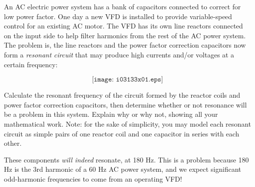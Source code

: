 

An AC electric power system has a bank of capacitors connected to correct for low power factor.  One day a new VFD is installed to provide variable-speed control for an existing AC motor.  The VFD has its own line reactors connected on the input side to help filter harmonics from the rest of the AC power system.  The problem is, the line reactors and the power factor correction capacitors now form a {\it resonant circuit} that may produce high currents and/or voltages at a certain frequency:

$$\texttt{[image: i03133x01.eps]}$$

Calculate the resonant frequency of the circuit formed by the reactor coils and power factor correction capacitors, then determine whether or not resonance will be a problem in this system.  Explain why or why not, showing all your mathematical work.  Note: for the sake of simplicity, you may model each resonant circuit as simple pairs of one reactor coil and one capacitor in series with each other.







These components {\it will indeed} resonate, at 180 Hz.  This is a problem because 180 Hz is the 3rd harmonic of a 60 Hz AC power system, and we expect significant odd-harmonic frequencies to come from an operating VFD!











